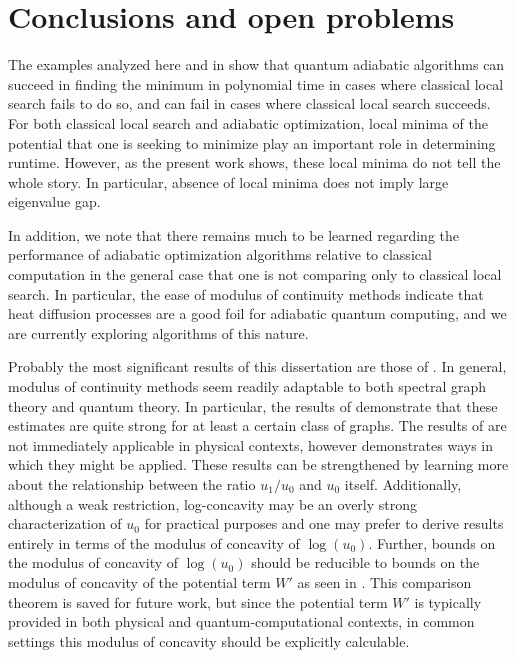 \documentclass[letterpaper,12pt]{umd-thesis}
\numberwithin{equation}{chapter}
\numberwithin{thm}{chapter}
\numberwithin{lem}{chapter}
\numberwithin{cor}{chapter}
\numberwithin{definition}{chapter}
\begin{document}










\chapter{Conclusions and open problems}
The examples analyzed here and in \cite{R04, DMV01, FGG02, VDV03,
  aminchoi} show that quantum adiabatic algorithms can succeed in
finding the minimum in polynomial time in cases where classical local
search fails to do so, and can fail in cases where classical local
search succeeds. For both classical local search and adiabatic
optimization, local minima of the potential that one is seeking to
minimize play an important role in determining runtime. However, as
the present work shows, these local minima do not tell the whole
story. In particular, absence of local minima does not imply large
eigenvalue gap.

In addition, we note that there remains much to be learned regarding
the performance of adiabatic optimization algorithms relative to
classical computation in the general case that one is not comparing
only to classical local search. In particular, the ease of modulus of continuity methods indicate that heat diffusion processes are a good foil for adiabatic quantum computing, and we are currently exploring algorithms of this nature.

Probably the most significant results of this dissertation are those of . In general, modulus of continuity methods seem readily adaptable to both spectral graph theory and quantum theory. In particular, the results of  demonstrate that these estimates are quite strong for at least a certain class of graphs. The results of  are not immediately applicable in physical contexts, however  demonstrates ways in which they might be applied. These results can be strengthened by learning more about the relationship between the ratio $u_1/u_0$ and $u_0$ itself. Additionally, although a weak restriction, log-concavity may be an overly strong characterization of $u_0$ for practical purposes and one may prefer to derive results entirely in terms of the modulus of concavity of $\log(u_0)$. Further, bounds on the modulus of concavity of $\log(u_0)$ should be reducible to bounds on the modulus of concavity of the potential term $W'$ as seen in \cite{Andrews2011}. This comparison theorem is saved for future work, but since the potential term $W'$ is typically provided in both physical and quantum-computational contexts, in common settings this modulus of concavity should be explicitly calculable.
\end{document}
